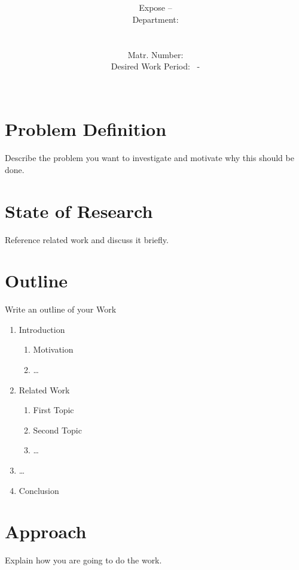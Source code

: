 \documentclass[a4paper,10pt]{scrartcl}
\author{
  Expose -- \thesisType\\
  Department: \department\\
  \\
  \authorName \\
  Matr. Number: \matrNumber \\
  Desired Work Period: \desiredStartDate \,\,\,- \desiredEndDate \\
  \email
  \\
}
\title{
\titleName\\
\ifCmdExists{subtitleName}{{\small \subtitleName}}{bla}
}
\begin{document}
\maketitle

\section{Problem Definition}
  Describe the problem you want to investigate and motivate why this should be done.

\section{State of Research}
  Reference related work and discuss it briefly.

\section{Outline}
  Write an outline of your Work
  \begin{enumerate}
    \item Introduction
    \begin{enumerate}
     \item Motivation
     \item \ldots
    \end{enumerate}
    \item Related Work
    \begin{enumerate}
     \item First Topic
     \item Second Topic
     \item \ldots
    \end{enumerate}
    \item \ldots
    \item Conclusion
  \end{enumerate}


\section{Approach}
  Explain how you are going to do the work.


 
 
\end{document}
